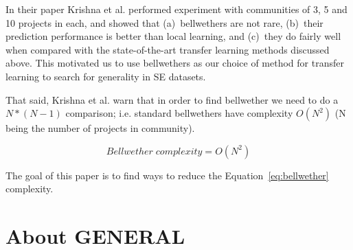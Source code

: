\documentclass[10pt,journal,compsoc]{IEEEtran}
\begin{document}
In their paper Krishna et al. performed experiment with communities of 3, 5 and 10 projects in each, and showed that (a)~bellwethers are not rare, (b)~their prediction performance is better than local learning, and (c)~they do fairly well when compared with 
the state-of-the-art transfer learning methods discussed above.
This motivated us to use  bellwethers as our choice of method for transfer learning to search for generality in SE datasets. 

That said,  Krishna et al. warn that in order to find bellwether we need to do a $ N*(N-1) $ comparison; i.e. standard bellwethers
have complexity $ O(N^2) $ (N being the number of projects in community). 

\begin{equation}
\label{eq:bellwether}
    \mathit{Bellwether\; complexity } = O(N^2)
\end{equation}

The goal of this paper is to find ways to reduce the Equation~\ref{eq:bellwether} complexity.




 
\section{About GENERAL}\label{sec:Metric Extraction}
\label{GENERAL}



 
 
 
 
 
\end{document}

